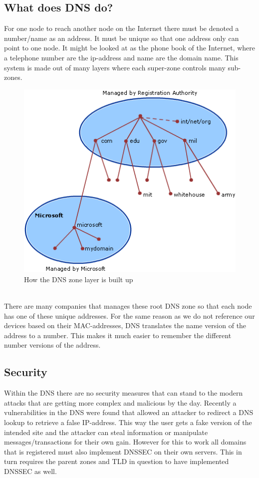 \documentclass{article}
\begin{document}
		\subsection{What does DNS do?}
		For one node to reach another node on the Internet there must be denoted a number/name as an address. It must be unique so that one address only can point to one node. It might be looked at as the phone book of the Internet, where a telephone number are the ip-address and name are the domain name.
        This system is made out of many layers where each super-zone controls many sub-zones. \\
        \begin{figure}[htbp]
            \centering
            \includegraphics[scale=0.6]{dnsStruct}
            \caption{How the DNS zone layer is built up\cite{microsoftDnsModel}}
        \end{figure}\\
		There are many companies that manages these root DNS zone so that each node has one of these unique addresses. For the same reason as we do not reference our devices based on their MAC-addresses, DNS translates the name version of the address to a number. This makes it much easier to remember the different number versions of the address.
		\subsection{Security}
		Within the DNS there are no security measures that can stand to the modern attacks that are getting more complex and malicious by the day. Recently a vulnerabilities in the DNS were found that allowed an attacker to redirect a DNS lookup to retrieve a false IP-address. This way the user gets a fake version of the intended site and the attacker can steal information or manipulate messages/transactions for their own gain. However for this to work all domains that is registered must also implement DNSSEC on their own servers. This in turn requires the parent zones and TLD in question to have implemented DNSSEC as well.
\end{document}
